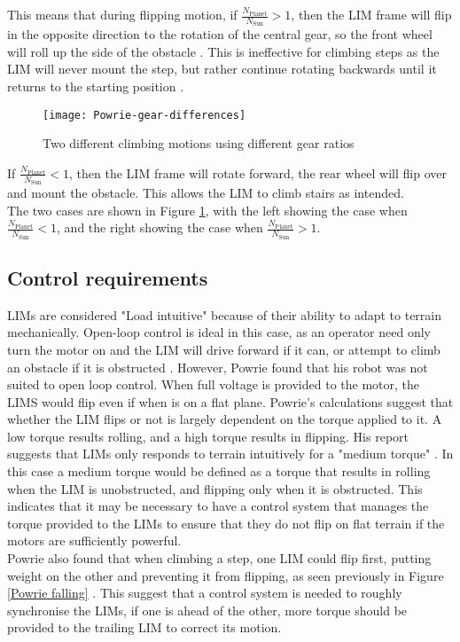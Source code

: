 This means that during flipping motion, if $\frac{N_\mathrm{Planet}}{N_\mathrm{Sun}} > 1$, then the LIM frame will flip in the opposite direction to the rotation of the central gear, so the front wheel will roll up the side of the obstacle \citep{Wilson-2013}. This is ineffective for climbing steps as the LIM will never mount the step, but rather continue rotating backwards until it returns to the starting position \citep{Haskel-2017}.\\

\begin{figure}[h]
	\centering
	\texttt{[image: Powrie-gear-differences]}
	\caption{Two different climbing motions using different gear ratios \citep{Powrie-2019}}
	\label{Powrie gears}
\end{figure}

If $\frac{N_\mathrm{Planet}}{N_\mathrm{Sun}} < 1$, then the LIM frame will rotate forward, the rear wheel will flip over and mount the obstacle. This allows the LIM to climb stairs as intended.\\
The two cases are shown in Figure \ref{Powrie gears}, with the left showing the case when $\frac{N_\mathrm{Planet}}{N_\mathrm{Sun}} < 1$, and the right showing the case when $\frac{N_\mathrm{Planet}}{N_\mathrm{Sun}} > 1$.



\subsection{Control requirements} %

LIMs are considered "Load intuitive" because of their ability to adapt to terrain mechanically. Open-loop control is ideal in this case, as an operator need only turn the motor on and the LIM will drive forward if it can, or attempt to climb an obstacle if it is obstructed \citep{Wilson-2013}. However, Powrie found that his robot was not suited to open loop control. When full voltage is provided to the motor, the LIMS would flip even if when is on a flat plane. Powrie's calculations suggest that whether the LIM flips or not is largely dependent on the torque applied to it. A low torque results rolling, and a high torque results in flipping. His report suggests that LIMs only responds to terrain intuitively for a "medium torque" \citep{Powrie-2019}. In this case a medium torque would be defined as a torque that results in rolling when the LIM is unobstructed, and flipping only when it is obstructed. This indicates that it may be necessary to have a control system that manages the torque provided to the LIMs to ensure that they do not flip on flat terrain if the motors are sufficiently powerful.\\

Powrie also found that when climbing a step, one LIM could flip first, putting weight on the other and preventing it from flipping, as seen previously in Figure \ref{Powrie falling} \citep{Powrie-2019}. This suggest that a control system is needed to roughly synchronise the LIMs, if one is ahead of the other, more torque should be provided to the trailing LIM to correct its motion.